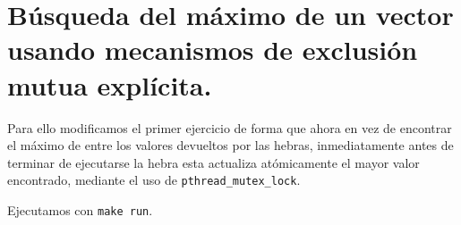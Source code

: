 \section{Búsqueda del máximo de un vector usando mecanismos de exclusión mutua explícita.}

Para ello modificamos el primer ejercicio de forma que ahora en vez de encontrar el máximo
de entre los valores devueltos por las hebras, inmediatamente antes de terminar de ejecutarse
la hebra esta actualiza atómicamente el mayor valor encontrado, mediante el uso de \texttt{pthread\_mutex\_lock}.

Ejecutamos con \texttt{make run}.